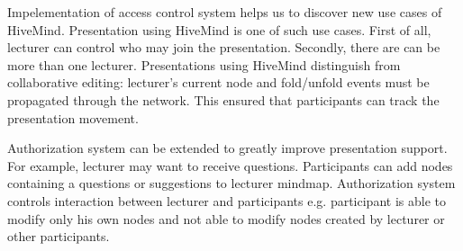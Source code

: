Impelementation of access control system helps us to discover new use cases of
HiveMind. Presentation using HiveMind is one of such use cases. First of all,
lecturer can control who may join the presentation. Secondly, there are can be
more than one lecturer. Presentations using HiveMind distinguish from
collaborative editing: lecturer's current node and fold/unfold events must be
propagated through the network. This ensured that participants can track the
presentation movement.
 
Authorization system can be extended to greatly improve presentation
support. For example, lecturer may want to receive questions. Participants
can add nodes containing a questions or suggestions to lecturer mindmap.
Authorization system controls interaction between lecturer and participants e.g.
participant is able to modify only his own nodes and not able to modify nodes
created by lecturer or other participants.
